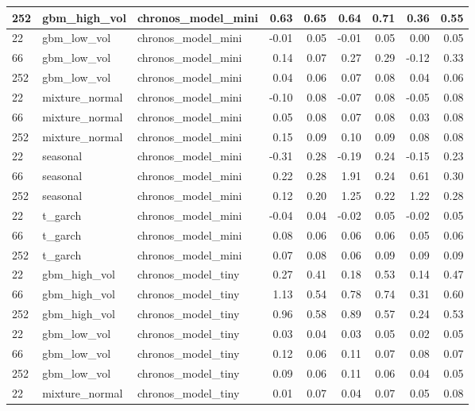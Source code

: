 {\begin{tabular}{lllrrrrrr}
252 & gbm\_high\_vol & chronos\_model\_mini & 0.63 & 0.65 & 0.64 & 0.71 & 0.36 & 0.55 \\
\midrule
22 & gbm\_low\_vol & chronos\_model\_mini & -0.01 & 0.05 & -0.01 & 0.05 & 0.00 & 0.05 \\
66 & gbm\_low\_vol & chronos\_model\_mini & 0.14 & 0.07 & 0.27 & 0.29 & -0.12 & 0.33 \\
252 & gbm\_low\_vol & chronos\_model\_mini & 0.04 & 0.06 & 0.07 & 0.08 & 0.04 & 0.06 \\
\midrule
22 & mixture\_normal & chronos\_model\_mini & -0.10 & 0.08 & -0.07 & 0.08 & -0.05 & 0.08 \\
66 & mixture\_normal & chronos\_model\_mini & 0.05 & 0.08 & 0.07 & 0.08 & 0.03 & 0.08 \\
252 & mixture\_normal & chronos\_model\_mini & 0.15 & 0.09 & 0.10 & 0.09 & 0.08 & 0.08 \\
\midrule
22 & seasonal & chronos\_model\_mini & -0.31 & 0.28 & -0.19 & 0.24 & -0.15 & 0.23 \\
66 & seasonal & chronos\_model\_mini & 0.22 & 0.28 & 1.91 & 0.24 & 0.61 & 0.30 \\
252 & seasonal & chronos\_model\_mini & 0.12 & 0.20 & 1.25 & 0.22 & 1.22 & 0.28 \\
\midrule
22 & t\_garch & chronos\_model\_mini & -0.04 & 0.04 & -0.02 & 0.05 & -0.02 & 0.05 \\
66 & t\_garch & chronos\_model\_mini & 0.08 & 0.06 & 0.06 & 0.06 & 0.05 & 0.06 \\
252 & t\_garch & chronos\_model\_mini & 0.07 & 0.08 & 0.06 & 0.09 & 0.09 & 0.09 \\
\midrule
22 & gbm\_high\_vol & chronos\_model\_tiny & 0.27 & 0.41 & 0.18 & 0.53 & 0.14 & 0.47 \\
66 & gbm\_high\_vol & chronos\_model\_tiny & 1.13 & 0.54 & 0.78 & 0.74 & 0.31 & 0.60 \\
252 & gbm\_high\_vol & chronos\_model\_tiny & 0.96 & 0.58 & 0.89 & 0.57 & 0.24 & 0.53 \\
\midrule
22 & gbm\_low\_vol & chronos\_model\_tiny & 0.03 & 0.04 & 0.03 & 0.05 & 0.02 & 0.05 \\
66 & gbm\_low\_vol & chronos\_model\_tiny & 0.12 & 0.06 & 0.11 & 0.07 & 0.08 & 0.07 \\
252 & gbm\_low\_vol & chronos\_model\_tiny & 0.09 & 0.06 & 0.11 & 0.06 & 0.04 & 0.05 \\
\midrule
22 & mixture\_normal & chronos\_model\_tiny & 0.01 & 0.07 & 0.04 & 0.07 & 0.05 & 0.08 \\

\end{tabular}}
